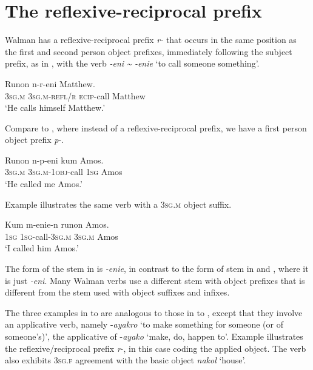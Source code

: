 \documentclass[output=paper]{langscibook}
\begin{document}
\section{The reflexive-reciprocal prefix}\label{sec:Brown:3}%



 Walman has a reflexive-reciprocal prefix \emph{r-} that occurs in the same position as the first and second person object prefixes, immediately following the subject prefix, as in , with the verb \emph{{}-eni {\textasciitilde} -enie} ‘to call someone something’.


\ea%
    \label{ex:Brown:9}
    \gll  Runon  n-r-eni  Matthew.\\
        \textsc{3sg.m}  \textsc{3sg.m}{}-\textsc{refl/r}%
\textsc{ecip}{}-call  Matthew\\
    \glt  ‘He calls himself Matthew.’
    \z

Compare  to , where instead of a reflexive-reciprocal prefix, we have a first person object prefix \emph{p}{}-.

\ea%
    \label{ex:Brown:10}
    \gll  Runon  n-p-eni  kum  Amos.\\
        \textsc{3sg.m}  \textsc{3sg.m}{}-\textsc{1obj}{}-call  \textsc{1sg}  Amos \\
    \glt   ‘He called me Amos.’
    \z
    
Example  illustrates the same verb with a \textsc{3sg.m} object suffix. 


\ea%
    \label{ex:Brown:11}
    \gll Kum  m-enie-n  runon  Amos.\\
        \textsc{1sg}  \textsc{1sg}{}-call-\textsc{3sg.m}  \textsc{3sg.m}  Amos\\
    \glt ‘I called him Amos.’
    \z

The form of the stem in  is \emph{{}-enie}, in contrast to the form of stem in  and , where it is just \emph{{}-eni}. Many Walman verbs use a different stem with object prefixes that is different from the stem used with object suffixes and infixes.



  The three examples in  to  are analogous to those in  to , except that they involve an applicative verb, namely -\emph{ayakro} ‘to make something for someone (or of someone’s)’, the applicative of -\emph{ayako} ‘make, do, happen to’. Example  illustrates the reflexive/reciprocal prefix \emph{r}{}-, in this case coding the applied object. The verb also exhibits \textsc{3sg.f} agreement with the basic object \emph{nakol} ‘house’.
\end{document}
